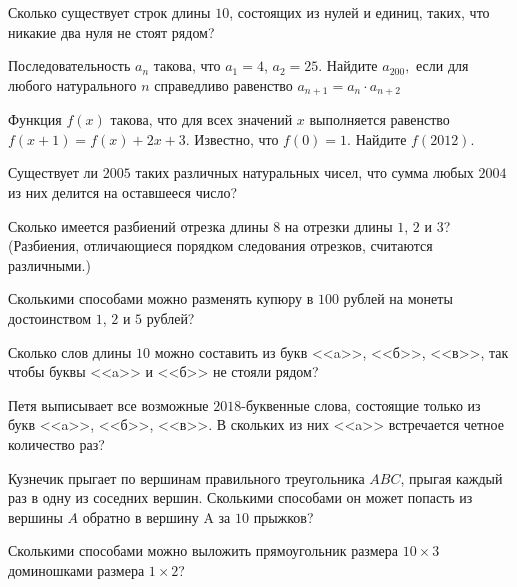 \resetproblem \begingroup %
    \def\jeolmdate{16 ноября 2018}%
\jeolmheader \endgroup


\begin{problems}

\item Сколько существует строк длины $10$, состоящих из нулей и единиц, таких, что никакие два нуля не стоят рядом?

\item Последовательность $a_n$ такова, что $a_1=4$, $a_2=25$. Найдите $a_{200},$ если для любого натурального $n$ справедливо равенство $a_{n+1}=a_n \cdot a_{n+2}$


\item Функция $f(x)$ такова, что для всех значений $x$ выполняется равенство  $f(x + 1) = f(x) + 2x + 3$.  Известно, что  $f(0) = 1$.  Найдите $f(2012)$.


\item Существует ли $2005$ таких различных натуральных чисел, что сумма любых $2004$ из них делится на оставшееся число?


\item Сколько имеется разбиений отрезка длины $8$ на отрезки длины $1$, $2$ и $3$? (Разбиения, отличающиеся порядком следования отрезков, считаются различными.)


\item Сколькими способами можно разменять купюру в $100$ рублей на монеты достоинством $1$, $2$ и $5$ рублей?


\item Сколько слов длины $10$ можно составить из букв <<a>>, <<б>>, <<в>>, так чтобы буквы <<a>> и <<б>> не стояли рядом?


\item Петя выписывает все возможные $2018$-буквенные слова, состоящие только из букв <<a>>, <<б>>, <<в>>. В скольких из них <<a>> встречается четное количество раз?



\item Кузнечик прыгает по вершинам правильного треугольника $ABC$, прыгая каждый раз в одну из соседних вершин. Сколькими способами он может попасть из вершины $A$ обратно в вершину A за $10$ прыжков?


\item Сколькими способами можно выложить прямоугольник размера $10\times 3$ доминошками размера $1\times 2$?






\end{problems}